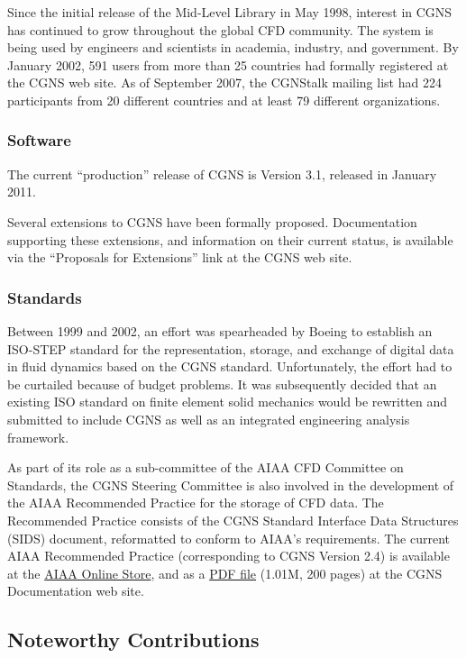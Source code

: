 Since the initial release of the Mid-Level Library in May 1998,
interest in CGNS has continued to grow throughout the global CFD
community.
The system is being used by engineers and scientists in academia,
industry, and government.
By January 2002, 591 users from more than 25 countries had formally
registered at the CGNS web site.
As of September 2007, the CGNStalk mailing list had 224 participants
from 20 different countries and at least 79 different organizations.

\subsubsection{Software}

The current ``production'' release of CGNS is Version 3.1, released in
January 2011.

Several extensions to CGNS have been formally proposed.
Documentation supporting these extensions, and information on their
current status, is available via the ``Proposals for Extensions'' link at
the CGNS web site.

\subsubsection{Standards}

Between 1999 and 2002, an effort was spearheaded by Boeing to establish
an ISO-STEP standard for the representation, storage, and exchange of
digital data in fluid dynamics based on the CGNS standard.
Unfortunately, the effort had to be curtailed because of budget
problems.
It was subsequently decided that an existing ISO standard on finite
element solid mechanics would be rewritten and submitted to include CGNS
as well as an integrated engineering analysis framework.

As part of its role as a sub-committee of the AIAA CFD Committee
on Standards, the CGNS Steering Committee is also involved in the
development of the AIAA Recommended Practice for the storage of CFD
data.
The Recommended Practice consists of the CGNS Standard Interface
Data Structures (SIDS) document, reformatted to conform to AIAA's
requirements.
The current AIAA Recommended Practice (corresponding to CGNS Version
2.4) is available at the
\href{http://www.aiaa.org/content.cfm?pageid=363&id=1657}{AIAA
Online Store}, and as a
\href{http://www.grc.nasa.gov/www/cgns/sids/aiaa/R_101A_2005.pdf}{PDF file}
(1.01M, 200 pages) at the CGNS Documentation web site.

\subsection{Noteworthy Contributions}

